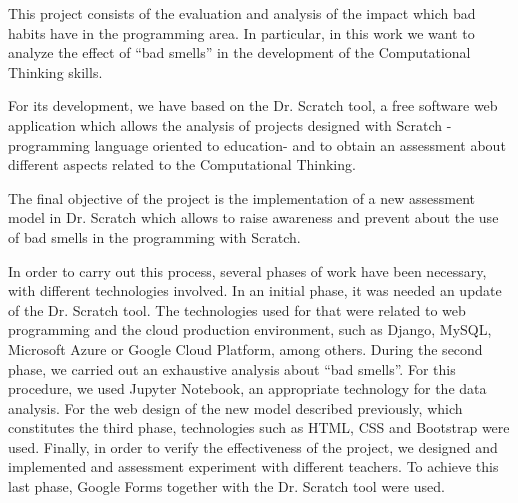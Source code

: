 This project consists of the evaluation and analysis of the impact which bad habits have in the programming area. In particular, in this work we want to analyze the effect of ``bad smells'' in the development of the Computational Thinking skills. 

For its development, we have based on the Dr. Scratch tool, a free software web application which allows the analysis of projects designed with Scratch -programming language oriented to education- and to obtain an assessment about different aspects related to the Computational Thinking.

The final objective of the project is the implementation of a new assessment model in Dr. Scratch which allows to raise awareness and prevent about the use of bad smells in the programming with Scratch.

In order to carry out this process, several phases of work have been necessary, with different technologies involved. In an initial phase, it was needed an update of the Dr. Scratch tool. The technologies used for that were related to web programming and the cloud production environment, such as Django, MySQL, Microsoft Azure or Google Cloud Platform, among others. During the second phase, we carried out an exhaustive analysis about ``bad smells''. For this procedure, we used Jupyter Notebook, an appropriate technology for the data analysis. For the web design of the new model described previously, which constitutes the third phase, technologies such as HTML, CSS and Bootstrap were used. Finally, in order to verify the effectiveness of the project, we designed and implemented and assessment experiment with different teachers. To achieve this last phase, Google Forms together with the Dr. Scratch tool were used.
